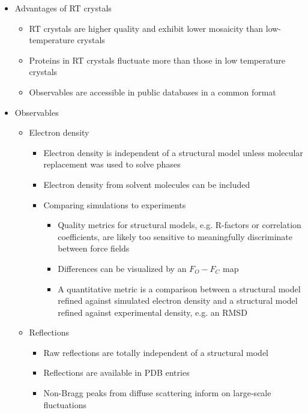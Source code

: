 \documentclass[9pt,review]{livecoms}
\begin{document}
\begin{itemize}

\item Advantages of RT crystals

	\begin{itemize}
	\item RT crystals are higher quality and exhibit lower mosaicity than low-temperature crystals
	\item Proteins in RT crystals fluctuate more than those in low temperature crystals
	\item Observables are accessible in public databases in a common format
	\end{itemize}

\item Observables

	\begin{itemize}

	\item Electron density

		\begin{itemize}
		\item Electron density is independent of a structural model unless molecular replacement was used to solve phases
		\item Electron density from solvent molecules can be included
		\item Comparing simulations to experiments

			\begin{itemize}
			\item Quality metrics for structural models, e.g. R-factors or correlation coefficients, are likely too sensitive to meaningfully discriminate between force fields
			\item Differences can be visualized by an $F_O - F_C$ map
			\item A quantitative metric is a comparison between a structural model refined against simulated electron density and a structural model refined against experimental density, e.g. an RMSD
			\end{itemize}

		\end{itemize}

	\item Reflections

		\begin{itemize}
		\item Raw reflections are totally independent of a structural model
		\item Reflections are available in PDB entries
		\item Non-Bragg peaks from diffuse scattering inform on large-scale fluctuations
		\end{itemize}


\end{itemize}
\end{itemize}
\end{document}
